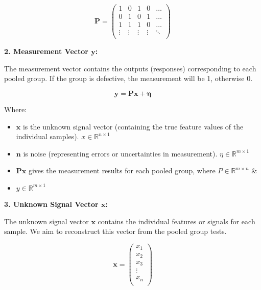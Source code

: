 \documentclass{article}
\begin{document}
\begin{enumerate}
\begin{enumerate}
        \[
        \mathbf{P} = 
        \begin{pmatrix}
        1 & 0 & 1 & 0 & \dots \\
        0 & 1 & 0 & 1 & \dots \\
        1 & 1 & 1 & 0 & \dots \\
        \vdots & \vdots & \vdots & \vdots & \ddots \\
        \end{pmatrix}
        \]
        
        \textbf{2. Measurement Vector \( \mathbf{y} \):}
        
        The measurement vector contains the outputs (responses) corresponding to each pooled group. If the group is defective, the measurement will be 1, otherwise 0.
        
        \[
        \mathbf{y} = \mathbf{P} \mathbf{x} + \mathbf{\eta}
        \]
        
        Where:
        \begin{itemize}
            \item \( \mathbf{x} \) is the unknown signal vector (containing the true feature values of the individual samples). $x \in \mathbb{R}^{n \times 1}$
            \item \( \mathbf{n} \) is noise (representing errors or uncertainties in measurement). $\eta \in \mathbb{R}^{m \times 1}$
            \item \( \mathbf{P} \mathbf{x} \) gives the measurement results for each pooled group, where $P \in \mathbb{R}^{m \times n}$ \&
            \item $y \in \mathbb{R}^{m \times 1}$
        \end{itemize}
        
        \textbf{3. Unknown Signal Vector \( \mathbf{x} \):}
        
        The unknown signal vector \( \mathbf{x} \) contains the individual features or signals for each sample. We aim to reconstruct this vector from the pooled group tests.
        
        \[
        \mathbf{x} = 
        \begin{pmatrix}
        x_1 \\
        x_2 \\
        x_3 \\
        \vdots \\
        x_n \\
        \end{pmatrix}
        \]


\end{enumerate}
\end{enumerate}
\end{document}
